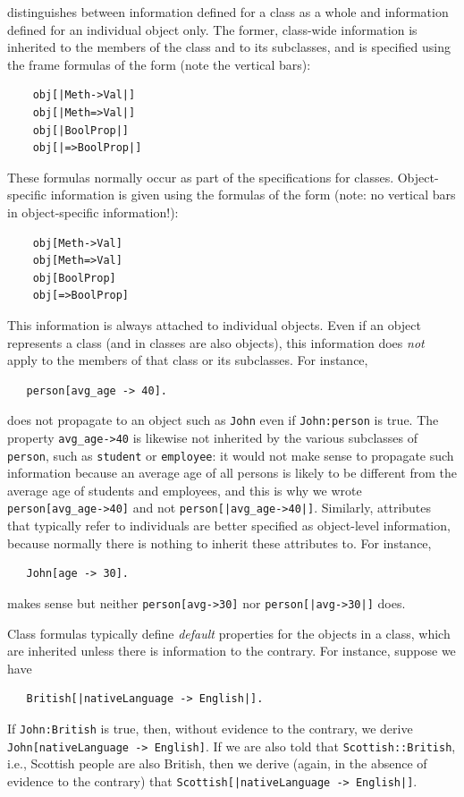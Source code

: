 \documentclass[11pt]{article}
\newcommand{\ERGO}{\mbox{\smaller{\ensuremath{\cal{E}}\smaller{{\sc{RGO}}}}}\xspace}
\newcommand{\FLSYSTEM}{\ERGO}
\begin{document}
\FLSYSTEM distinguishes between information defined for a class as a whole
and information defined for an individual object only.
The former, class-wide information is inherited to the members of the class and to its
subclasses, and is specified using the frame formulas of the form
(note the vertical bars):
\begin{verbatim}
    obj[|Meth->Val|]
    obj[|Meth=>Val|]
    obj[|BoolProp|]
    obj[|=>BoolProp|]
\end{verbatim}
These formulas normally occur as part of the specifications for classes.
Object-specific information is given using the formulas of
the form (note: no vertical bars in object-specific information!):
\begin{verbatim}
    obj[Meth->Val]
    obj[Meth=>Val]
    obj[BoolProp]
    obj[=>BoolProp]
\end{verbatim}
This information is always attached to individual
objects. Even if an object represents a class (and in \FLSYSTEM classes are
also objects), this information
does \emph{not} apply to the members of that class or its subclasses. For
instance,
\begin{verbatim}
   person[avg_age -> 40].  
\end{verbatim}
does not propagate to an object such as \texttt{John} even if
\texttt{John:person}  is true. The property \texttt{avg\_age->40} 
is likewise not inherited by the various subclasses of
\texttt{person}, such as \texttt{student} or \texttt{employee}: it would
not make sense to propagate such information because an average age of all
persons is likely to be different from the average age of students and
employees, and this is why we wrote \texttt{person[avg\_age->40]}   
and not \texttt{person[|avg\_age->40|]}.
Similarly, attributes that typically refer to individuals are better
specified as object-level information, because normally there is nothing to
inherit these attributes to. For instance,
\begin{verbatim}
   John[age -> 30].  
\end{verbatim}
makes sense but neither \texttt{person[avg->30]} nor
\texttt{person[|avg->30|]} does.

Class formulas typically define \emph{default} properties 
for the objects in a class, which are inherited unless there is information
to the contrary. For instance, suppose we have
\begin{verbatim}
   British[|nativeLanguage -> English|].  
\end{verbatim}
If {\tt John:British} is true, then, without evidence to the contrary,
we derive {\tt
  John[nativeLanguage -> English]}.
If we are also told that {\tt Scottish::British}, i.e., Scottish
  people are also British, then we derive (again, in the absence of 
  evidence to the contrary)
  that {\tt Scottish[|nativeLanguage -> English|]}.
  
\end{document}
